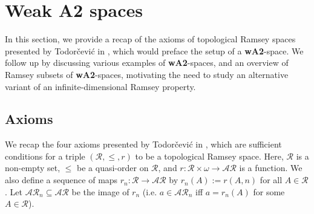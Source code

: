 \documentclass[11pt,reqno]{amsart}
\theoremstyle{plain}
\numberwithin{equation}{section}
\theoremstyle{definition}
\newcommand{\cal}{\mathcal}
\begin{document}
\section{Weak \textbf{A2} spaces}
In this section, we provide a recap of the axioms of topological Ramsey spaces presented by Todor\v{c}evi\'{c} in \cite{T10}, which would preface the setup of a \textbf{wA2}-space. We follow up by discussing various examples of \textbf{wA2}-spaces, and an overview of Ramsey subsets of \textbf{wA2}-spaces, motivating the need to study an alternative variant of an infinite-dimensional Ramsey property.

\subsection{Axioms} 
We recap the four axioms presented by Todor\v{c}evi\'{c} in \cite{T10}, which are sufficient conditions for a triple $(\cal{R},\leq,r)$ to be a topological Ramsey space. Here, $\cal{R}$ is a non-empty set, $\leq$ be a quasi-order on $\cal{R}$, and $r : \cal{R} \times \omega \to \cal{AR}$ is a function. We also define a sequence of maps $r_n : \cal{R} \to \cal{AR}$ by $r_n(A) := r(A,n)$ for all $A \in \cal{R}$. Let $\cal{AR}_n \subseteq \cal{AR}$ be the image of $r_n$ (i.e. $a \in \cal{AR}_n$ iff $a = r_n(A)$ for some $A \in \cal{R}$).
\end{document}
